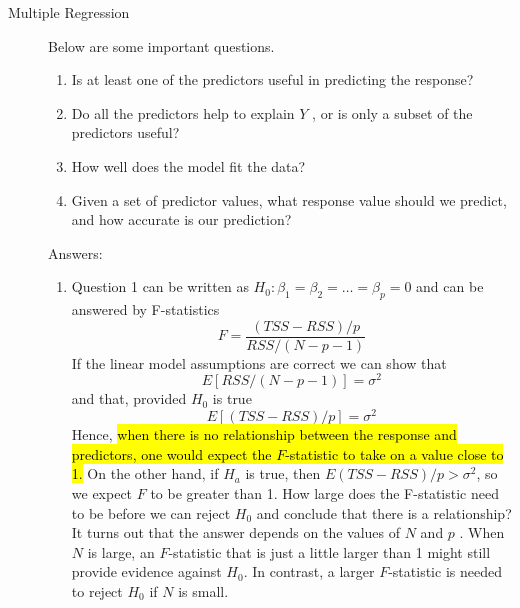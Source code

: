 \begin{description}
\item [Multiple Regression]
Below are some important questions.
\begin{enumerate}
\item Is at least one of the predictors useful in predicting the response?
\item Do all the predictors help to explain $Y$ , or is only a subset of the predictors useful?
\item How well does the model fit the data?
\item Given a set of predictor values, what response value should we predict,
and how accurate is our prediction?
\end{enumerate}
Answers:
\begin{enumerate}
\item Question 1 can be written as $H_0: \beta_1 = \beta_2 = \dots =\beta_p = 0$
and can be answered by F-statistics 
\begin{equation}
F = \frac{(TSS-RSS) / p}{ RSS / (N - p - 1)}
\end{equation}
If the linear model assumptions are correct we can show that
\begin{equation}
E[RSS/(N - p - 1)] = \sigma^2
\end{equation}
and that, provided $H_0$ is true 
\begin{equation}
E[(TSS - RSS) / p] = \sigma^2
\end{equation}
Hence, \hl{when there is no relationship between 
the response and predictors, one would expect the 
$F$-statistic to take on a value close to 1.}
On the other hand, if $H_a$ is true, then 
$E{(TSS - RSS)/p} > \sigma^2$, so we expect $F$ to be greater than 1.
How large does the F-statistic need to be before we can reject 
$H_0$ and conclude that there is a relationship? It turns 
out that the answer depends on the values of $N$  and $p$ . 
When $N$ is large, an $F$-statistic that is just a little larger than 1 might 
still provide evidence against $H_0$. In contrast, a larger $F$-statistic is 
needed to reject $H_0$ if $N$ is small.


\end{enumerate}
\end{description}
